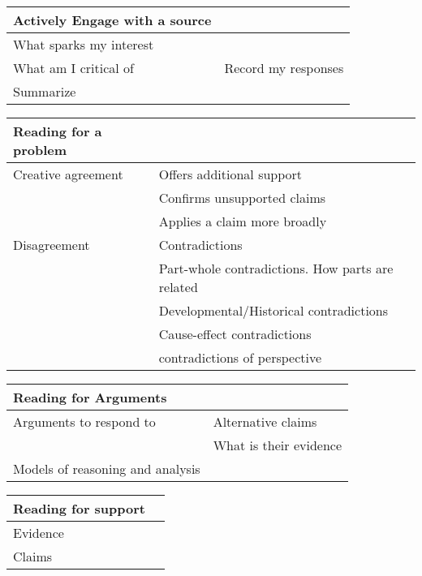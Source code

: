 \documentclass[10pt, a4paper]{article}
\begin{document}
	\begin{tabular}{|l |l|}
		\hline
		Actively Engage with a source&\\
		\hline
		What sparks my interest&\\
		\hline
		What am I critical of&Record my responses\\
		\hline
		Summarize&\\
		\hline
	\end{tabular}

	\begin{tabular}{|l |l|}
		\hline
		Reading for a problem&\\
		\hline
		Creative agreement &Offers additional support\\
		&Confirms unsupported claims\\
		&Applies a claim more broadly\\
		\hline
		Disagreement&Contradictions\\
		&Part-whole contradictions. How parts are related\\
		&Developmental/Historical contradictions\\
		&Cause-effect contradictions\\
		&contradictions of perspective\\
		\hline
	\end{tabular}



	\begin{tabular}{|l |l|}
		\hline
		Reading for Arguments &\\
		\hline
		Arguments to respond to & Alternative claims\\
		& What is their evidence\\
		\hline
		Models of reasoning and analysis&\\
		\hline
		
	\end{tabular}

\begin{tabular}{|l |l|}
	\hline
	Reading for support &\\
	\hline
	Evidence&\\
	\hline
	Claims &\\
\end{tabular}



\end{document}
